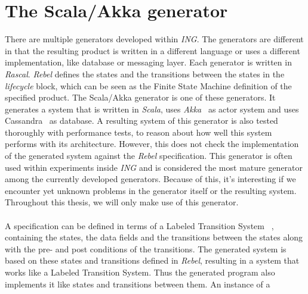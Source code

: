 \section{The Scala/Akka generator}
There are multiple generators developed within \textit{ING}. The generators are
different in that the resulting product is written in a different language or
uses a different implementation, like database or messaging layer. Each
generator is written in \textit{Rascal}. \textit{Rebel} defines the states and
the transitions between the states in the \textit{lifecycle} block, which can be
seen as the Finite State Machine definition of the specified product. The
Scala/Akka generator is one of these generators. It generates a system that is
written in \textit{Scala}, uses \textit{Akka}~\cite{siteAkka2017} as actor
system and uses Cassandra~\cite{siteCassandra2016} as database. A resulting
system of this generator is also tested thoroughly with performance tests, to
reason about how well this system performs with its architecture. However, this
does not check the implementation of the generated system against the
\textit{Rebel} specification. This generator is often used within experiments
inside \textit{ING} and is considered the most mature generator among the
currently developed generators. Because of this, it's interesting if we
encounter yet unknown problems in the generator itself or the resulting system.
Throughout this thesis, we will only make use of this generator.\\
\\
A specification can be defined in terms of a Labeled Transition
System~\cite{stoel2016solving}%
, containing the states, the data fields and the transitions between the states
along with the pre- and post conditions of the transitions. The generated system
is based on these states and transitions defined in \textit{Rebel}, resulting in
a system that works like a Labeled Transition System. Thus the generated program
also implements it like states and transitions between them. An instance of a
